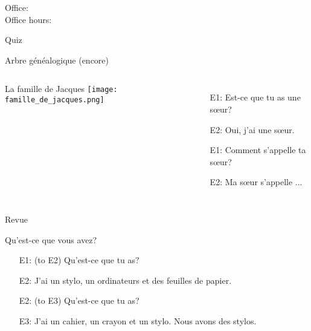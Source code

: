 \documentclass{beamer}
\subtitle[Le verb \lexi{avoir}]{Le verb \lexi{avoir}}
\begin{document}
  \begin{frame}
    \titlepage
    \tiny{Office: \\
          Office hours: }
  \end{frame}

  \begin{frame}{}
    \begin{center}
      \Large Quiz
    \end{center}
  \end{frame}

  \begin{frame}{Arbre généalogique (encore) }
    \begin{columns}[t]
        La famille de Jacques
        \texttt{[image: famille\_de\_jacques.png]}
        \begin{itemize}
          \item[E1:] Est-ce que tu as une sœur?
          \item[E2:] Oui, j'ai une sœur.
          \item[E1:] Comment s'appelle ta sœur?
          \item[E2:] Ma sœur s'appelle ...
        \end{itemize}
    \end{columns}
  \end{frame}

  \begin{frame}{Revue }
    \begin{center}
      
    \end{center}
  \end{frame}

  \begin{frame}{Qu'est-ce que vous avez? }
    \begin{itemize}
      \item[E1:] (to E2) Qu'est-ce que tu as?
      \item[E2:] J'ai un \alert{stylo}, un ordinateurs et des feuilles de papier.
      \item[E2:] (to E3) Qu'est-ce que tu as?
      \item[E3:] J'ai un cahier, un crayon et un \alert{stylo}. Nous avons \alert{des stylos}.
    \end{itemize}
  \end{frame}
\end{document}
